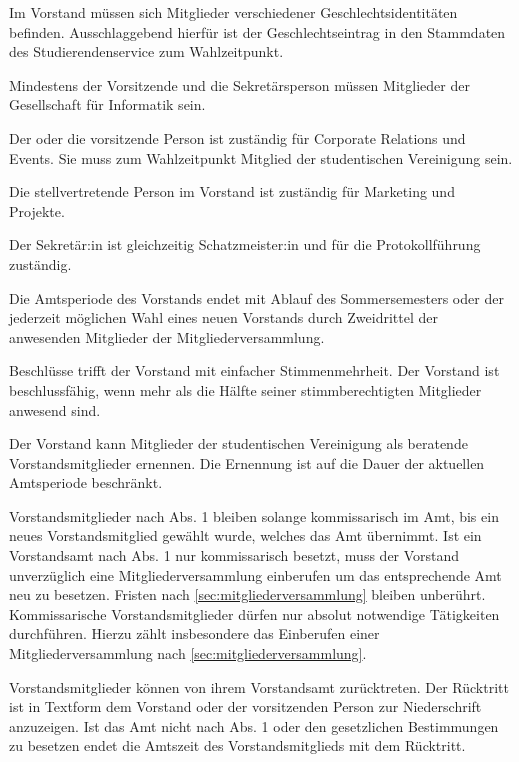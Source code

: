 \begin{contract}
Im Vorstand müssen sich Mitglieder verschiedener Geschlechtsidentitäten befinden. Ausschlaggebend hierfür ist der Geschlechtseintrag in den Stammdaten des Studierendenservice zum Wahlzeitpunkt.

Mindestens der Vorsitzende und die Sekretärsperson müssen Mitglieder der Gesellschaft für Informatik sein.

Der oder die vorsitzende Person ist zuständig für Corporate Relations und Events. Sie muss zum Wahlzeitpunkt Mitglied der studentischen Vereinigung sein.

Die stellvertretende Person im Vorstand ist zuständig für Marketing und Projekte.

Der Sekretär:in ist gleichzeitig Schatzmeister:in und für die Protokollführung zuständig.

Die Amtsperiode des Vorstands endet mit Ablauf des Sommersemesters oder der jederzeit möglichen Wahl eines neuen Vorstands durch Zweidrittel der anwesenden Mitglieder der Mitgliederversammlung. \label{sec:vorstand-VorzeitigeAbwahl}

Beschlüsse trifft der Vorstand mit einfacher Stimmenmehrheit. Der Vorstand ist beschlussfähig, wenn mehr als die Hälfte seiner stimmberechtigten Mitglieder anwesend sind.

Der Vorstand kann Mitglieder der studentischen Vereinigung als beratende Vorstandsmitglieder ernennen. Die Ernennung ist auf die Dauer der aktuellen Amtsperiode beschränkt.

Vorstandsmitglieder nach Abs. 1 bleiben solange kommissarisch im Amt, bis ein neues Vorstandsmitglied gewählt wurde, welches das Amt übernimmt. Ist ein Vorstandsamt nach Abs. 1 nur kommissarisch besetzt, muss der Vorstand unverzüglich eine Mitgliederversammlung einberufen um das entsprechende Amt neu zu besetzen. Fristen nach \ref{sec:mitgliederversammlung} bleiben unberührt. Kommissarische Vorstandsmitglieder dürfen nur absolut notwendige Tätigkeiten durchführen. Hierzu zählt insbesondere das Einberufen einer Mitgliederversammlung nach \ref{sec:mitgliederversammlung}.

Vorstandsmitglieder können von ihrem Vorstandsamt zurücktreten. Der Rücktritt ist in Textform dem Vorstand oder der vorsitzenden Person zur Niederschrift anzuzeigen. Ist das Amt nicht nach Abs. 1 oder den gesetzlichen Bestimmungen zu besetzen endet die Amtszeit des Vorstandsmitglieds mit dem Rücktritt.

\label{sec:geschäftsbereichVorstand}


\end{contract}
